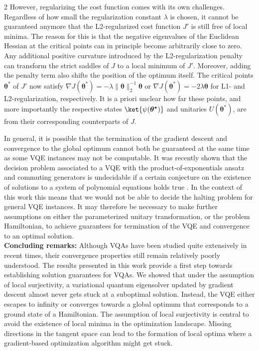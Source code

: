 \documentclass{article}
\renewcommand{\vec}[1]{\ensuremath{\boldsymbol{#1}}}
\begin{document}
\begin{multicols}{2}
However, regularizing the cost function comes with its own challenges.
Regardless of how small the regularization constant \(\lambda\) is chosen, it cannot be guaranteed anymore  that the L2-regularized cost function \(J'\) is still free of local minima. 
The reason for this is that the negative eigenvalues of the Euclidean Hessian at the critical points can in principle become arbitrarily close to zero.
Any additional positive curvature introduced by the L2-regularization penalty can transform the strict saddles of \(J\) to a local minimum of \(J'\).
Moreover, adding the penalty term also shifts the position of the optimum itself.
The critical points \(\vec{\theta}^*\) of \(J'\) now satisfy \(\nabla J (\vec{\theta}^*) = -\lambda \lVert\vec{\theta}\rVert_2^{-1} \vec{\theta}\) or \(\nabla J (\vec{\theta}^*) = - 2 \lambda \vec{\theta}\) for L1- and L2-regularization, respectively.
It is a priori unclear how far these points, and more importantly the respective states \(\ket{\psi(\vec{\theta^*})}\) and unitaries \(U(\vec{\theta}^*)\), are from their corresponding counterparts of \(J\).

In general, it is possible that the termination of the gradient descent and convergence to the global optimum cannot both be guaranteed at the same time as  some \gls{VQE} instances may not be computable.
It was recently shown that the decision problem associated to a \gls{VQE} with the product-of-exponentials ansatz and commuting generators is undecidable if a certain conjecture on the existence of solutions to a system of polynomial equations holds true \cite{korpas_undecidable_2025}. In the context of this work this means that we would not be able to decide the halting problem for general \gls{VQE} instances.
It may therefore be necessary to make further assumptions on either the parameterized unitary transformation, or the problem Hamiltonian, to achieve guarantees for termination of the VQE and convergence to an optimal solution.
\\[1em]
\indent \textbf{Concluding remarks:} Although \glspl{VQA} have been studied quite extensively in recent times, their convergence properties still remain relatively poorly understood. The results presented in this work provide a first step towards establishing solution guarantees for VQAs. We showed that under the assumption of local surjectivity, a variational quantum eigensolver updated by gradient descent almost never gets stuck at a suboptimal solution.
Instead, the VQE either escapes to infinity or converges towards a global optimum that corresponds to a ground state of a Hamiltonian. 
The assumption of local surjectivity is central to avoid the existence of local minima in the optimization landscape.
Missing directions in the tangent space can lead to the formation of local optima where a gradient-based optimization algorithm might get stuck.


\end{multicols}
\end{document}
